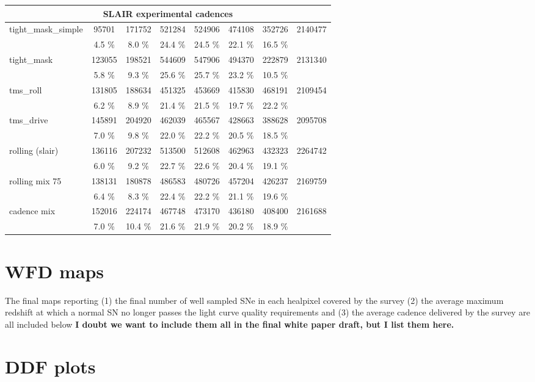 \documentclass [11pt,a4paper]{article}
\newcommand{\FixMe}[1]{{\color{red} \bf \large #1}}
\begin{document}
\begin{appendices}
\begin{longtable}{l|ccccccc}
\hline
\hline       
\multicolumn{8}{c}{SLAIR experimental cadences}\\
\hline
   tight\_mask\_simple &   95701 &  171752 &  521284 &  524906 &  474108 &  352726 &  2140477 \\ 
                     &    4.5 \% &    8.0 \% &   24.4 \% &   24.5 \% &   22.1 \% &   16.5 \% & \\
\hline
          tight\_mask &  123055 &  198521 &  544609 &  547906 &  494370 &  222879 &  2131340 \\ 
                     &    5.8 \% &    9.3 \% &   25.6 \% &   25.7 \% &   23.2 \% &   10.5 \% & \\
\hline
            tms\_roll &  131805 &  188634 &  451325 &  453669 &  415830 &  468191 &  2109454 \\ 
                     &    6.2 \% &    8.9 \% &   21.4 \% &   21.5 \% &   19.7 \% &   22.2 \% & \\
\hline
           tms\_drive &  145891 &  204920 &  462039 &  465567 &  428663 &  388628 &  2095708 \\ 
                     &    7.0 \% &    9.8 \% &   22.0 \% &   22.2 \% &   20.5 \% &   18.5 \% & \\
\hline
     rolling (slair) &  136116 &  207232 &  513500 &  512608 &  462963 &  432323 &  2264742 \\ 
                     &    6.0 \% &    9.2 \% &   22.7 \% &   22.6 \% &   20.4 \% &   19.1 \% & \\
\hline
      rolling mix 75 &  138131 &  180878 &  486583 &  480726 &  457204 &  426237 &  2169759 \\ 
                     &    6.4 \% &    8.3 \% &   22.4 \% &   22.2 \% &   21.1 \% &   19.6 \% & \\
\hline
         cadence mix &  152016 &  224174 &  467748 &  473170 &  436180 &  408400 &  2161688 \\ 
                     &    7.0 \% &   10.4 \% &   21.6 \% &   21.9 \% &   20.2 \% &   18.9 \% & \\
\hline

      
    \end{longtable}
  
  \section{WFD maps}
  \label{sec:wfd_maps}
  The final maps reporting (1) the final number of well sampled SNe in
  each healpixel covered by the survey (2) the average maximum
  redshift at which a normal SN no longer passes the light curve
  quality requirements and (3) the average cadence delivered by the
  survey are all included below \FixMe{I doubt we want to include them
    all in the final white paper draft, but I list them here.}
  
  
    
  \section{DDF plots}

  

\end{appendices}
\end{document}
